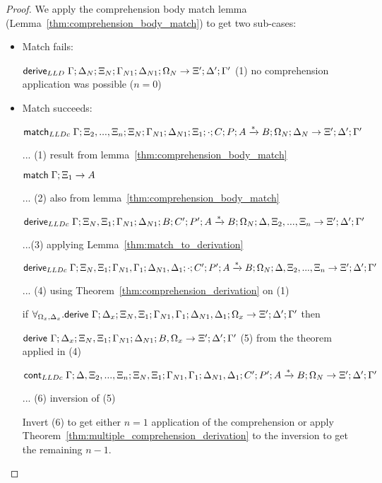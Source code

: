 \begin{proof}
We apply the comprehension body match lemma (Lemma~\ref{thm:comprehension_body_match}) to get two sub-cases:
   
\begin{itemize}
   \item Match fails:
   
   {\small
   
   $\mathsf{derive}_{LLD} \; \Gamma; \Delta_N; \Xi_N; \Gamma_{N1}; \Delta_{N1}; \Omega_N \rightarrow \Xi'; \Delta'; \Gamma'$ \hfill (1) no comprehension application was possible ($n = 0$)\\
   }
   
   \item Match succeeds:
   
   {\small
   $\mathsf{match}_{LLDc} \; \Gamma; \Xi_2, ..., \Xi_n; \Xi_N; \Gamma_{N1}; \Delta_{N1}; \Xi_1; \cdot; C; P; A \xrightarrow{*} B; \Omega_N; \Delta_N \rightarrow \Xi'; \Delta'; \Gamma'$
   
   ... \hfill (1) result from lemma~\ref{thm:comprehension_body_match}
   
   $\mathsf{match} \; \Gamma; \Xi_1 \rightarrow A$
   
   ... \hfill (2) also from lemma~\ref{thm:comprehension_body_match}
   
   $\mathsf{derive}_{LLDc} \; \Gamma; \Xi_N, \Xi_1; \Gamma_{N1}; \Delta_{N1}; B; C'; P'; A \xrightarrow{*} B; \Omega_N; \Delta, \Xi_2, ..., \Xi_n \rightarrow \Xi'; \Delta'; \Gamma'$
   
   ...\hfill (3) applying Lemma~\ref{thm:match_to_derivation}
   
   $\mathsf{derive}_{LLDc} \; \Gamma; \Xi_N, \Xi_1; \Gamma_{N1}, \Gamma_1; \Delta_{N1}, \Delta_1; \cdot; C'; P'; A \xrightarrow{*} B; \Omega_N; \Delta, \Xi_2, ..., \Xi_n \rightarrow \Xi'; \Delta'; \Gamma'$
   
   ... \hfill (4) using Theorem~\ref{thm:comprehension_derivation} on (1)
   
   if $\forall_{\Omega_x, \Delta_x}. \mathsf{derive}~ \Gamma; \Delta_x; \Xi_N, \Xi_1; \Gamma_{N1}, \Gamma_1; \Delta_{N1}, \Delta_1; \Omega_x \rightarrow \Xi'; \Delta'; \Gamma'$ then
   
    \hspace*{0.5cm} $\mathsf{derive}~ \Gamma; \Delta_x; \Xi_N, \Xi_1; \Gamma_{N1}; \Delta_{N1}; B, \Omega_x \rightarrow \Xi'; \Delta'; \Gamma'$ \hfill (5) from the theorem applied in (4)
   
   $\mathsf{cont}_{LLDc} \; \Gamma; \Delta, \Xi_2, ..., \Xi_n; \Xi_N, \Xi_1; \Gamma_{N1}, \Gamma_1; \Delta_{N1}, \Delta_1; C'; P'; A \xrightarrow{*} B; \Omega_N \rightarrow \Xi'; \Delta'; \Gamma'$
   
   ... \hfill (6) inversion of (5)
   
   Invert (6) to get either $n = 1$ application of the comprehension or apply Theorem~\ref{thm:multiple_comprehension_derivation} to the inversion to get the remaining $n-1$. 
   
   }
\end{itemize}
\end{proof}